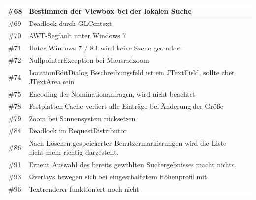 \documentclass[10pt]{scrreprt}
\begin{document}
\begin{longtable}{|c|p{5.2cm}|p{8.2cm}|}
\hline
\#68 & Bestimmen der Viewbox bei der lokalen Suche & \\
\hline
\#69 & Deadlock durch GLContext & \\
\hline
\#70 & AWT-Segfault unter Windows 7 & \\
\hline
\#71 & Unter Windows 7 / 8.1 wird keine Szene gerendert & \\
\hline
\#72 & NullpointerException bei Mausradzoom & \\
\hline
\#74 & LocationEditDialog Beschreibungsfeld ist ein JTextField, sollte aber JTextArea sein & \\
\hline
\#75 & Encoding der Nominationanfragen, wird nicht beachtet & \\
\hline
\#78 & Festplatten Cache verliert alle Einträge bei Änderung der Größe & \\
\hline
\#79 & Zoom bei Sonnensystem rücksetzen & \\
\hline
\#84 & Deadlock im RequestDistributor & \\
\hline
\#86 & Nach Löschen gespeicherter Benutzermarkierungen wird die Liste nicht mehr richtig dargestellt. & \\
\hline
\#91 & Erneut Auswahl des bereits gewählten Suchergebnisses macht nichts. & \\
\hline
\#93 & Overlays bewegen sich bei eingeschaltetem Höhenprofil mit. & \\
\hline
\#96 & Textrenderer funktioniert noch nicht & \\
\hline
\end{longtable}
\end{document}
